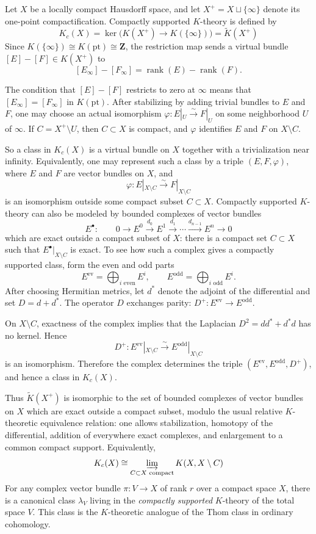 \documentclass[12pt]{article}
\begin{document}
Let $X$ be a locally compact Hausdorff space, and let $X^+ = X\sqcup\{\infty\}$ denote its
one-point compactification. Compactly supported $K$-theory is defined by
\[
K_c(X) = \ker\big(K(X^+)\longrightarrow K(\{\infty\})\big) = \widetilde K(X^+)
\]
Since $K(\{\infty\})\cong K(\mathrm{pt})\cong\mathbf Z$, the restriction map sends a virtual
bundle $[E]-[F]\in K(X^+)$ to
\[
[E_\infty]-[F_\infty] = \operatorname{rank}(E)-\operatorname{rank}(F).
\]


The condition that $[E]-[F]$ restricts to zero at $\infty$ means that $[E_\infty]=[F_\infty]$
in $K(\mathrm{pt})$. After stabilizing by adding trivial bundles to $E$ and $F$, one may
choose an actual isomorphism $\varphi: E|_U\xrightarrow{\sim}F|_U$ on some neighborhood $U$
of $\infty$. If $C=X^+\setminus U$, then $C\subset X$ is compact, and $\varphi$ identifies
$E$ and $F$ on $X\setminus C$.

So a class in $K_c(X)$ is a virtual bundle on $X$ together with a trivialization near
infinity. Equivalently, one may represent such a class by a triple $(E,F,\varphi)$, where $E$
and $F$ are vector bundles on $X$, and
\[
\varphi: E|_{X\setminus C}\xrightarrow{\sim}F|_{X\setminus C}
\]
is an isomorphism outside some compact subset $C\subset X$. Compactly supported $K$-theory can also be modeled by bounded complexes of vector bundles
\[
E^\bullet:\qquad 0\longrightarrow E^0\xrightarrow{d_0}E^1\xrightarrow{d_1}\cdots
\xrightarrow{d_{n-1}}E^n\longrightarrow 0
\]
which are exact outside a compact subset of $X$: there is a compact set $C\subset X$ such
that $E^\bullet|_{X\setminus C}$ is exact. To see how such a complex gives a compactly supported class, form the even and odd parts
\[
E^{\mathrm{ev}} = \bigoplus_{i\text{ even}}E^i,
\qquad
E^{\mathrm{odd}} = \bigoplus_{i\text{ odd}}E^i.
\]
After choosing Hermitian metrics, let $d^*$ denote the adjoint of the differential and set
$D=d+d^*$. The operator $D$ exchanges parity: $D^+: E^{\mathrm{ev}}\to E^{\mathrm{odd}}$.

On $X\setminus C$, exactness of the complex implies that the Laplacian $D^2=dd^*+d^*d$ has no
kernel. Hence
\[
D^+: E^{\mathrm{ev}}|_{X\setminus C}\xrightarrow{\sim} E^{\mathrm{odd}}|_{X\setminus C}
\]
is an isomorphism. Therefore the complex determines the triple $(E^{\mathrm{ev}},
E^{\mathrm{odd}}, D^+)$, and hence a class in $K_c(X)$.

Thus $\widetilde K(X^+)$ is isomorphic to the set of bounded complexes of vector bundles on
$X$ which are exact outside a compact subset, modulo the usual relative $K$-theoretic
equivalence relation: one allows stabilization, homotopy of the differential, addition of
everywhere exact complexes, and enlargement to a common compact support. Equivalently,
\[
K_c(X) \cong \varinjlim_{C\subset X\text{ compact}} K(X,X\setminus C)
\]
For any complex vector bundle $\pi:V\to X$ of rank $r$ over a
compact space $X$, there is a canonical class $\lambda_V$ living in the \emph{compactly supported}
$K$-theory of the total space $V$. This class is the $K$-theoretic analogue of the Thom
class in ordinary cohomology.
\end{document}
